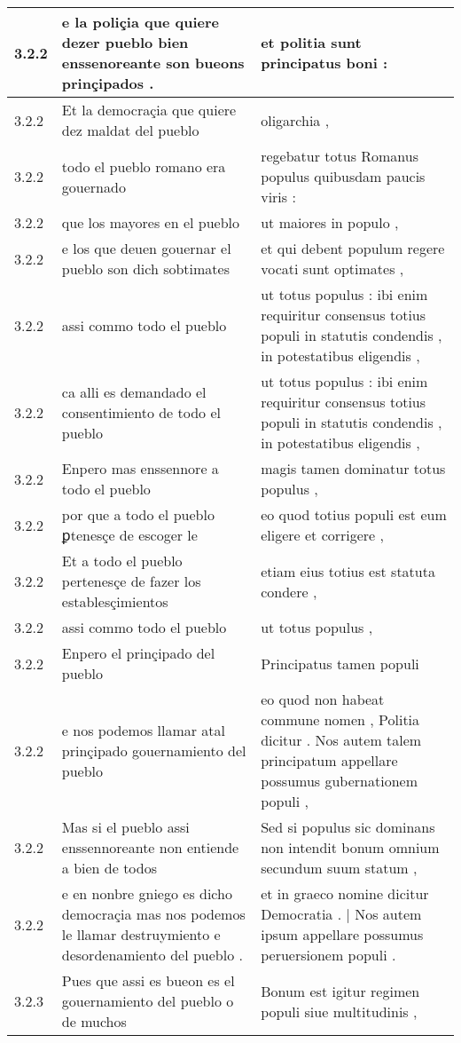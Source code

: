 \begin{tabular}{|p{1cm}|p{6.5cm}|p{6.5cm}|}
3.2.2 & e la poliçia que quiere dezer pueblo bien enssenoreante son bueons prinçipados . & et politia sunt principatus boni : \\\hline
3.2.2 & Et la democraçia que quiere dez maldat del pueblo & oligarchia , \\\hline
3.2.2 & todo el pueblo romano era gouernado & regebatur totus Romanus populus quibusdam paucis viris : \\\hline
3.2.2 & que los mayores en el pueblo & ut maiores in populo , \\\hline
3.2.2 & e los que deuen gouernar el pueblo son dich sobtimates & et qui debent populum regere vocati sunt optimates , \\\hline
3.2.2 & assi commo todo el pueblo & ut totus populus : ibi enim requiritur consensus totius populi in statutis condendis , in potestatibus eligendis , \\\hline
3.2.2 & ca alli es demandado el consentimiento de todo el pueblo & ut totus populus : ibi enim requiritur consensus totius populi in statutis condendis , in potestatibus eligendis , \\\hline
3.2.2 & Enpero mas enssennore a todo el pueblo & magis tamen dominatur totus populus , \\\hline
3.2.2 & por que a todo el pueblo ꝑtenesçe de escoger le & eo quod totius populi est eum eligere et corrigere , \\\hline
3.2.2 & Et a todo el pueblo pertenesçe de fazer los establesçimientos & etiam eius totius est statuta condere , \\\hline
3.2.2 & assi commo todo el pueblo & ut totus populus , \\\hline
3.2.2 & Enpero el prinçipado del pueblo & Principatus tamen populi \\\hline
3.2.2 & e nos podemos llamar atal prinçipado gouernamiento del pueblo & eo quod non habeat commune nomen , Politia dicitur . Nos autem talem principatum appellare possumus gubernationem populi , \\\hline
3.2.2 & Mas si el pueblo assi enssennoreante non entiende a bien de todos & Sed si populus sic dominans non intendit bonum omnium secundum suum statum , \\\hline
3.2.2 & e en nonbre gniego es dicho democraçia mas nos podemos le llamar destruymiento e desordenamiento del pueblo . & et in graeco nomine dicitur Democratia . | Nos autem ipsum appellare possumus peruersionem populi . \\\hline
3.2.3 & Pues que assi es bueon es el gouernamiento del pueblo o de muchos & Bonum est igitur regimen populi siue multitudinis , \\\hline

\end{tabular}
